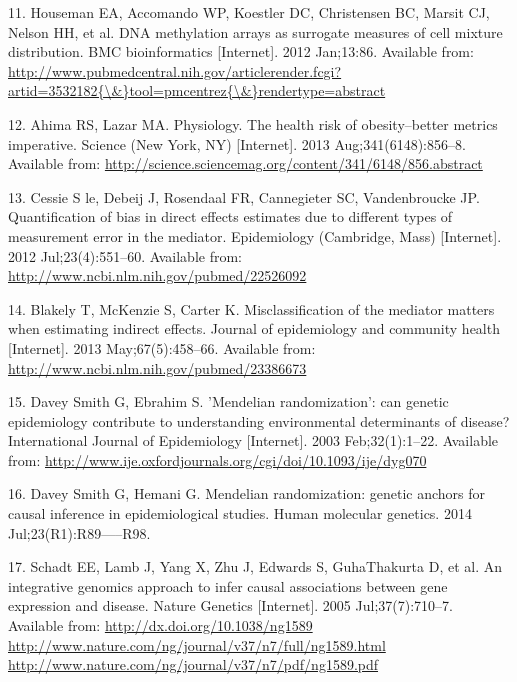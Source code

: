 \documentclass[]{article}
\begin{document}
\hypertarget{ref-Houseman2012}{}
11. Houseman EA, Accomando WP, Koestler DC, Christensen BC, Marsit CJ,
Nelson HH, et al. DNA methylation arrays as surrogate measures of cell
mixture distribution. BMC bioinformatics {[}Internet{]}. 2012 Jan;13:86.
Available from:
\href{http://www.pubmedcentral.nih.gov/articlerender.fcgi?artid=3532182\%7B/\&\%7Dtool=pmcentrez\%7B/\&\%7Drendertype=abstract}{http://www.pubmedcentral.nih.gov/articlerender.fcgi?artid=3532182\{\textbackslash{}\&\}tool=pmcentrez\{\textbackslash{}\&\}rendertype=abstract}

\hypertarget{ref-Ahima2013}{}
12. Ahima RS, Lazar MA. Physiology. The health risk of obesity--better
metrics imperative. Science (New York, NY) {[}Internet{]}. 2013
Aug;341(6148):856--8. Available from:
\url{http://science.sciencemag.org/content/341/6148/856.abstract}

\hypertarget{ref-LeCessie2012}{}
13. Cessie S le, Debeij J, Rosendaal FR, Cannegieter SC, Vandenbroucke
JP. Quantification of bias in direct effects estimates due to different
types of measurement error in the mediator. Epidemiology (Cambridge,
Mass) {[}Internet{]}. 2012 Jul;23(4):551--60. Available from:
\url{http://www.ncbi.nlm.nih.gov/pubmed/22526092}

\hypertarget{ref-Blakely2013}{}
14. Blakely T, McKenzie S, Carter K. Misclassification of the mediator
matters when estimating indirect effects. Journal of epidemiology and
community health {[}Internet{]}. 2013 May;67(5):458--66. Available from:
\url{http://www.ncbi.nlm.nih.gov/pubmed/23386673}

\hypertarget{ref-DaveySmith2003}{}
15. Davey Smith G, Ebrahim S. 'Mendelian randomization': can genetic
epidemiology contribute to understanding environmental determinants of
disease? International Journal of Epidemiology {[}Internet{]}. 2003
Feb;32(1):1--22. Available from:
\url{http://www.ije.oxfordjournals.org/cgi/doi/10.1093/ije/dyg070}

\hypertarget{ref-DaveySmithHemani2014}{}
16. Davey Smith G, Hemani G. Mendelian randomization: genetic anchors
for causal inference in epidemiological studies. Human molecular
genetics. 2014 Jul;23(R1):R89-----R98.

\hypertarget{ref-Schadt2005}{}
17. Schadt EE, Lamb J, Yang X, Zhu J, Edwards S, GuhaThakurta D, et al.
An integrative genomics approach to infer causal associations between
gene expression and disease. Nature Genetics {[}Internet{]}. 2005
Jul;37(7):710--7. Available from:
\href{http://dx.doi.org/10.1038/ng1589\%20http://www.nature.com/ng/journal/v37/n7/full/ng1589.html\%20http://www.nature.com/ng/journal/v37/n7/pdf/ng1589.pdf}{http://dx.doi.org/10.1038/ng1589 http://www.nature.com/ng/journal/v37/n7/full/ng1589.html http://www.nature.com/ng/journal/v37/n7/pdf/ng1589.pdf}
\end{document}
